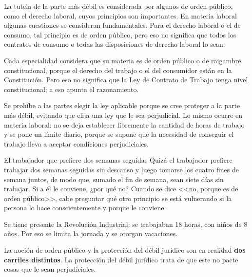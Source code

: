 \documentclass[12pt,oneside]{book}
\begin{document}
La tutela de la parte m\'as d\'ebil es considerada por algunos de orden p\'ublico, como el derecho laboral, cuyos principios son importantes. En materia laboral algunas cuestiones se consideran fundamentales. Para el derecho laboral o el de consumo, tal principio es de orden p\'ublico, pero eso no significa que todos los contratos de consumo o todas las disposiciones de derecho laboral lo sean.

Cada especialidad considera que su materia es de orden p\'ublico o de raigambre constitucional, porque el derecho del trabajo o el del consumidor est\'an en la Constituci\'on. Pero eso no significa que la Ley de Contrato de Trabajo tenga nivel constitucional; a eso apunta el razonamiento.

Se proh\'ibe a las partes elegir la ley aplicable porque se cree proteger a la parte m\'as d\'ebil, evitando que elija una ley que le sea perjudicial. Lo mismo ocurre en materia laboral: no se deja establecer libremente la cantidad de horas de trabajo y se pone un l\'imite diario, porque se supone que la necesidad de conseguir el trabajo lleva a aceptar condiciones perjudiciales.

\begin{example}{El trabajador que prefiere dos semanas seguidas}
Quiz\'a el trabajador prefiere trabajar dos semanas seguidas sin descanso y luego tomarse los cuatro fines de semana juntos, de modo que, sumado el fin de semana, sean siete d\'ias sin trabajar. Si a \'el le conviene, ¿por qu\'e no? Cuando se dice <<no, porque es de orden p\'ublico>>, cabe preguntar qu\'e otro principio se est\'a vulnerando si la persona lo hace conscientemente y porque le conviene.

Se tiene presente la Revoluci\'on Industrial: se trabajaban 18 horas, con ni\~nos de 8 a\~nos. Por eso se limita la jornada y se otorgan vacaciones.
\end{example}

La noci\'on de orden p\'ublico y la protecci\'on del d\'ebil jur\'idico son en realidad \textbf{dos carriles distintos}. La protecci\'on del d\'ebil jur\'idico trata de que este no pacte cosas que le sean perjudiciales.
\end{document}
